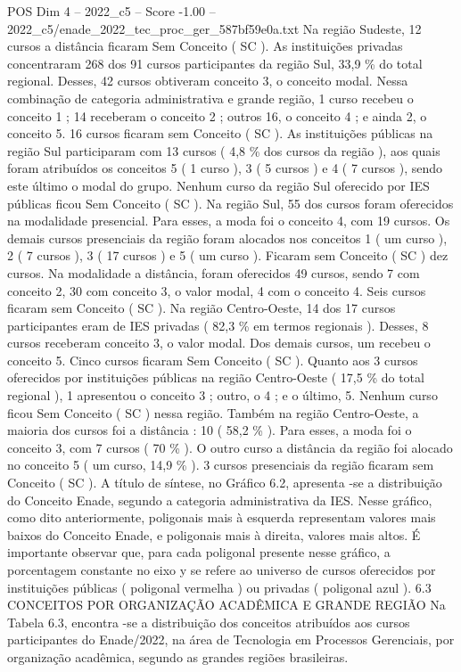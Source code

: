 \begin{textsample}{POS Dim 4 – 2022\_c5 – Score -1.00 – 2022\_c5/enade\_2022\_tec\_proc\_ger\_587bf59e0a.txt}
Na região Sudeste, 12 cursos a distância ficaram Sem Conceito ( SC ).
As instituições privadas concentraram 268 dos 91 cursos participantes da região Sul, 33,9 \% do total regional.
Desses, 42 cursos obtiveram conceito 3, o conceito modal.
Nessa combinação de categoria administrativa e grande região, 1 curso recebeu o conceito 1 ; 14 receberam o conceito 2 ; outros 16, o conceito 4 ; e ainda 2, o conceito 5. 16 cursos ficaram sem Conceito ( SC ).
As instituições públicas na região Sul participaram com 13 cursos ( 4,8 \% dos cursos da região ), aos quais foram atribuídos os conceitos 5 ( 1 curso ), 3 ( 5 cursos ) e 4 ( 7 cursos ), sendo este último o modal do grupo.
Nenhum curso da região Sul oferecido por IES públicas ficou Sem Conceito ( SC ).
Na região Sul, 55 dos cursos foram oferecidos na modalidade presencial.
Para esses, a moda foi o conceito 4, com 19 cursos.
Os demais cursos presenciais da região foram alocados nos conceitos 1 ( um curso ), 2 ( 7 cursos ), 3 ( 17 cursos ) e 5 ( um curso ).
Ficaram sem Conceito ( SC ) dez cursos.
Na modalidade a distância, foram oferecidos 49 cursos, sendo 7 com conceito 2, 30 com conceito 3, o valor modal, 4 com o conceito 4.
Seis cursos ficaram sem Conceito ( SC ).
Na região Centro-Oeste, 14 dos 17 cursos participantes eram de IES privadas ( 82,3 \% em termos regionais ).
Desses, 8 cursos receberam conceito 3, o valor modal.
Dos demais cursos, um recebeu o conceito 5.
Cinco cursos ficaram Sem Conceito ( SC ).
Quanto aos 3 cursos oferecidos por instituições públicas na região Centro-Oeste ( 17,5 \% do total regional ), 1 apresentou o conceito 3 ; outro, o 4 ; e o último, 5.
Nenhum curso ficou Sem Conceito ( SC ) nessa região.
Também na região Centro-Oeste, a maioria dos cursos foi a distância : 10 ( 58,2 \% ).
Para esses, a moda foi o conceito 3, com 7 cursos ( 70 \% ).
O outro curso a distância da região foi alocado no conceito 5 ( um curso, 14,9 \% ). 3 cursos presenciais da região ficaram sem Conceito ( SC ).
A título de síntese, no Gráfico 6.2, apresenta -se a distribuição do Conceito Enade, segundo a categoria administrativa da IES.
Nesse gráfico, como dito anteriormente, poligonais mais à esquerda representam valores mais baixos do Conceito Enade, e poligonais mais à direita, valores mais altos.
É importante observar que, para cada poligonal presente nesse gráfico, a porcentagem constante no eixo y se refere ao universo de cursos oferecidos por instituições públicas ( poligonal vermelha ) ou privadas ( poligonal azul ). 6.3 CONCEITOS POR ORGANIZAÇÃO ACADÊMICA E GRANDE REGIÃO Na Tabela 6.3, encontra -se a distribuição dos conceitos atribuídos aos cursos participantes do Enade/2022, na área de Tecnologia em Processos Gerenciais, por organização acadêmica, segundo as grandes regiões brasileiras.

\end{textsample}
